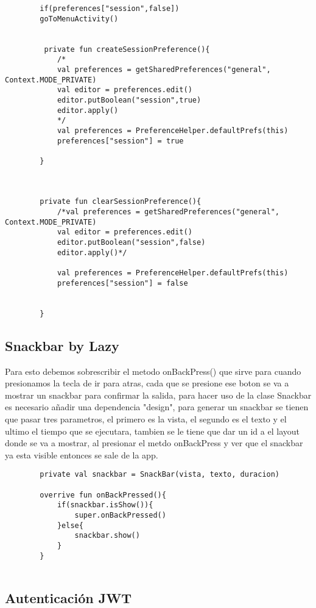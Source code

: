 \documentclass[a4paper]{article}
\begin{document}
\begin{lstlisting}
		if(preferences["session",false])
		goToMenuActivity()
		
		
		 private fun createSessionPreference(){
			/*
			val preferences = getSharedPreferences("general", Context.MODE_PRIVATE)
			val editor = preferences.edit()
			editor.putBoolean("session",true)
			editor.apply()
			*/
			val preferences = PreferenceHelper.defaultPrefs(this)
			preferences["session"] = true
			
		}
	
	
	
		private fun clearSessionPreference(){
			/*val preferences = getSharedPreferences("general", Context.MODE_PRIVATE)
			val editor = preferences.edit()
			editor.putBoolean("session",false)
			editor.apply()*/
			
			val preferences = PreferenceHelper.defaultPrefs(this)
			preferences["session"] = false
			
			
		}
		\end{lstlisting}
		
		
	
	\subsection{Snackbar by Lazy}
	Para esto debemos sobrescribir el metodo onBackPress() que sirve para cuando presionamos la tecla de ir para atras, cada que se presione ese boton se va a mostrar un snackbar para confirmar la salida, para hacer uso de la clase Snackbar es necesario añadir una dependencia "design", para generar un snackbar se tienen que pasar tres parametros, el primero es la vista, el segundo es el texto y el ultimo el tiempo que se ejecutara, tambien se le tiene que dar un id a el layout donde se va a mostrar, al presionar el metdo onBackPress y ver que el snackbar ya esta visible entonces se sale de la app.
	
	\begin{lstlisting}
		private val snackbar = SnackBar(vista, texto, duracion)
		
		overrive fun onBackPressed(){
			if(snackbar.isShow()){
				super.onBackPressed()
			}else{
				snackbar.show()
			}
		}
	
	\end{lstlisting}
	
	
	
	\subsection{Autenticación JWT}
	
\end{document}
